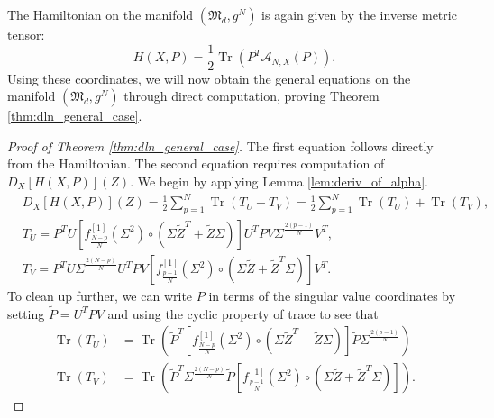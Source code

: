 \documentclass{amsart}
\DeclareMathOperator{\Tr}{Tr}
\theoremstyle{definition}
\theoremstyle{remark}
\numberwithin{equation}{section}
\begin{document}
The Hamiltonian on the manifold $(\mathfrak{M}_d, g^N)$ is again given by the inverse metric tensor:
\begin{equation}
    H(X,P) = \frac{1}{2}\Tr\left(P^T \mathcal{A}_{N,X}(P)\right).
\end{equation}
Using these coordinates, we will now obtain the general equations on the manifold $(\mathfrak{M}_d, g^N)$ through direct computation, proving Theorem \ref{thm:dln_general_case}.
\begin{proof}[Proof of Theorem \ref{thm:dln_general_case}]
The first equation follows directly from the Hamiltonian. The second equation requires computation of $D_X[H(X,P)](Z)$. We begin by applying Lemma \ref{lem:deriv_of_alpha}.
\begin{align}
    &D_X[H(X,P)](Z) = \frac{1}{2}\sum_{p=1}^N \Tr\left(T_U + T_V\right) = \frac{1}{2}\sum_{p=1}^N \Tr(T_U) + \Tr(T_V),
    \\&T_U = P^TU\left[f_{\frac{N-p}{N}}^{[1]} \left(\Sigma^2\right) \circ \left(\Sigma \tilde{Z}^T + \tilde{Z}\Sigma\right)\right]U^T P V\Sigma^{\frac{2(p-1)}{N}}V^T,
    \\&T_V = P^TU\Sigma^{\frac{2(N-p)}{N}}U^T P V\left[f_{\frac{p-1}{N}}^{[1]}\left(\Sigma^2\right) \circ \left(\Sigma \tilde{Z} + \tilde{Z}^T \Sigma\right)\right]V^T.
\end{align}
To clean up further, we can write $P$ in terms of the singular value coordinates by setting $\tilde{P} = U^T P V$ and using the cyclic property of trace to see that
\begin{align}
    \Tr(T_U) &= \Tr\left(\tilde{P}^T \left[f_{\frac{N-p}{N}}^{[1]}\left(\Sigma^2\right) \circ \left(\Sigma \tilde{Z}^T + \tilde{Z}\Sigma\right)\right] \tilde{P}\Sigma^{\frac{2(p-1)}{N}}\right)\label{eq:dln_geodesic_inter1}\\
    \Tr(T_V) &= \Tr\left(\tilde{P}^T \Sigma^{\frac{2(N-p)}{N}} \tilde{P} \left[ f_{\frac{p-1}{N}}^{[1]} \left(\Sigma^2\right) \circ \left(\Sigma \tilde{Z} + \tilde{Z}^T \Sigma\right)\right]\right)\label{eq:dln_geodesic_inter2}.
\end{align}


\end{proof}
\end{document}
